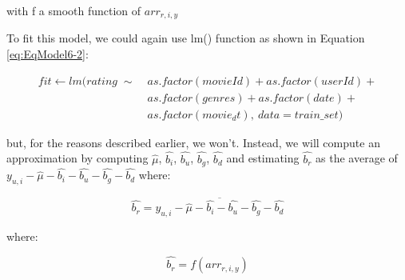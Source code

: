 \documentclass[
]{article}
\begin{document}
\begin{center}
with f a smooth function of $arr_{r,i,y}$
\end{center}

To fit this model, we could again use lm() function as shown in Equation
\ref{eq:EqModel6-2}:

%
\par

\label{eq:EqModel6-2} \begin{equation}
\begin{split}
  fit \leftarrow lm(rating \; \sim \; & as.factor(movieId) + as.factor(userId) + \\ 
  & as.factor(genres) + as.factor(date) + \\ 
  & as.factor(movie_dt), \: data = train\_{}set)
\end{split}
\end{equation}

but, for the reasons described earlier, we won't. Instead, we will
compute an approximation by computing \(\hat{\mu}\), \(\hat{b_{i}}\),
\(\hat{b_{u}}\), \(\hat{b_{g}}\), \(\hat{b_{d}}\) and estimating
\(\hat{b_{r}}\) as the average of
\(y_{u,i}-\hat{\mu}-\hat{b_{i}}-\hat{b_{u}}-\hat{b_{g}}-\hat{b_{d}}\)
where:\\

%
\par

\label{eq:EqModel6-3} \begin{equation}
  \hat{b_{r}} = \overline{y_{u,i} - \hat{\mu} - \hat{b_{i}} - \hat{b_{u}}  - \hat{b_{g}} - \hat{b_{d}}}
\end{equation}

where:

%
\par

\label{eq:EqModel6-4} \begin{equation}
  \hat{b_{r}} = f(arr_{r,i,y})
\end{equation}
\end{document}
